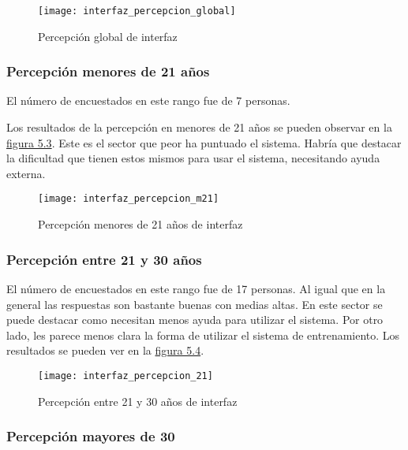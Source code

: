 \begin{figure}[htb]
  \centering
  \texttt{[image: interfaz\_percepcion\_global]}
  \caption[Percepción global de interfaz]{Percepción global de interfaz}
  \label{fig:Percepción global de interfaz}
\end{figure}

\subsubsection{Percepción menores de 21 años}

El número de encuestados en este rango fue de 7 personas.

Los resultados de la percepción en menores de 21 años se pueden observar en la \hyperref[fig:Percepción menores de 21 años de interfaz]{figura 5.3}.
Este es el sector que peor ha puntuado el sistema. Habría que destacar la dificultad
que tienen estos mismos para usar el sistema, necesitando ayuda externa.

\begin{figure}[htb]
  \centering
  \texttt{[image: interfaz\_percepcion\_m21]}
  \caption[Percepción menores de 21 años de interfaz]{Percepción menores de 21 años de interfaz}
  \label{fig:Percepción menores de 21 años de interfaz}
\end{figure}

\subsubsection{Percepción entre 21 y 30 años}

El número de encuestados en este rango fue de 17 personas. Al igual que en la general las respuestas
son bastante buenas con medias altas. En este sector se puede destacar como necesitan menos ayuda
para utilizar el sistema. Por otro lado, les parece menos clara la forma de utilizar el sistema
de entrenamiento. Los resultados se pueden ver en la \hyperref[fig:Percepción entre 21 y 30 años de interfaz]{figura 5.4}.

\begin{figure}[htb]
  \centering
  \texttt{[image: interfaz\_percepcion\_21]}
  \caption[Percepción entre 21 y 30 años de interfaz]{Percepción entre 21 y 30 años de interfaz}
  \label{fig:Percepción entre 21 y 30 años de interfaz}
\end{figure}

\subsubsection{Percepción mayores de 30}

